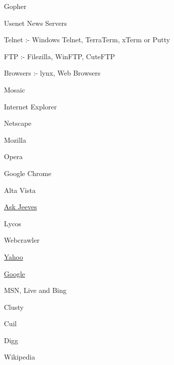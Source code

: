 \documentclass[30pt,landscape,footrule]{foils}
\begin{document}
\begin{itemize}
\small{
\item Gopher
\item Usenet News Servers 
\item Telnet :- Windows Telnet, TerraTerm, xTerm or Putty
\item FTP :- Filezilla, WinFTP, CuteFTP
\item Browsers :- lynx, Web Browsers
}
\end{itemize}


{\color{magenta}
\begin{itemize}
\small{
\item Mosaic\pause
\item Internet Explorer\pause
\item Netscape\pause
\item Mozilla\pause
\item Opera\pause
\item Google Chrome\pause
}
\end{itemize}
}


{\color{magenta}
\begin{itemize}
\small{
\item Alta Vista\pause
\item \href{www.ask.com} {Ask Jeeves}\pause
\item Lycos\pause
\item Webcrawler\pause
\item \href{www.yahoo.com} {Yahoo}\pause
\item \href{www.google.com} {Google}\pause
\item MSN, Live and Bing\pause
}
\end{itemize}
}

{\color{magenta}
\begin{itemize}
\small{
\item Clusty\pause
\item Cuil\pause
\item Digg\pause
\item Wikipedia\pause
}
\end{itemize}
}
\end{document}
